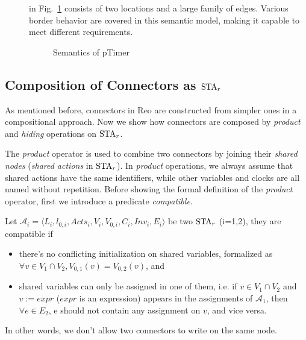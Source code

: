 \begin{description}
    \item[] in Fig.~\ref{fig:pTimer} consists of two locations and a large family of edges. Various border behavior are covered in this semantic model, making it capable to meet different requirements.
        \begin{figure}[H]
            \centering
            \resizebox{.8\textwidth}{!}{
                
            }
            \caption{Semantics of pTimer}
            \label{fig:pTimer}
        \end{figure}
\end{description}

\subsection{Composition of Connectors as $\mbox{STA}_r$}

As mentioned before, connectors in Reo are constructed from simpler ones in a compositional approach. Now we show how connectors are composed by \emph{product} and \emph{hiding} operations on $\mbox{STA}_r$.


The \emph{product} operator is used to combine two connectors by joining their \emph{shared nodes} (\emph{shared actions} in $\mbox{STA}_r$). In \emph{product} operations, we always assume that shared actions have the same identifiers, while other variables and clocks are all named without repetition. Before showing the formal definition of the \emph{product} operator, first we introduce a predicate \emph{compatible}.

\begin{definition}
    Let $\mathscr{A}_{i}=\langle L_{i}, l_{0,i}, Acts_{i}, V_{i}, V_{0,i}, C_{i}, Inv_{i}, E_{i} \rangle$ be two $\mbox{STA}_r$ (i=1,2), they are compatible if
    \begin{itemize}
        \item there's no conflicting initialization on shared variables, formalized as $\forall v\in V_1\cap V_2, V_{0,1}(v) = V_{0,2}(v)$, and
        \item shared variables can only be assigned in one of them, i.e. if $v\in V_1\cap V_2$ and $v:=expr$ ($expr$ is an expression) appears in the assignments of $\mathscr{A}_1$, then $\forall e\in E_2$, e should not contain any assignment on $v$, and vice versa.
    \end{itemize}
    In other words, we don't allow two connectors to write on the same node. 
\end{definition}

